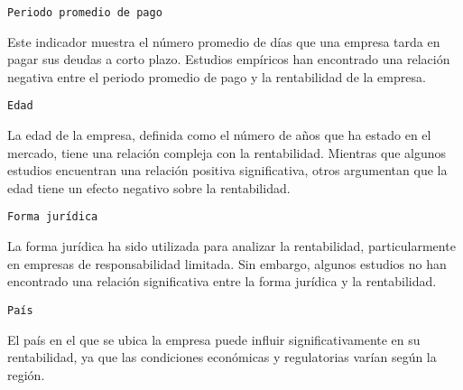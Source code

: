 \documentclass[
]{article}
\begin{document}
\begin{verbatim}
Periodo promedio de pago
\end{verbatim}

Este indicador muestra el número promedio de días que una empresa tarda
en pagar sus deudas a corto plazo. Estudios empíricos han encontrado una
relación negativa entre el periodo promedio de pago y la rentabilidad de
la empresa.

\begin{verbatim}
Edad
\end{verbatim}

La edad de la empresa, definida como el número de años que ha estado en
el mercado, tiene una relación compleja con la rentabilidad. Mientras
que algunos estudios encuentran una relación positiva significativa,
otros argumentan que la edad tiene un efecto negativo sobre la
rentabilidad.

\begin{verbatim}
Forma jurídica
\end{verbatim}

La forma jurídica ha sido utilizada para analizar la rentabilidad,
particularmente en empresas de responsabilidad limitada. Sin embargo,
algunos estudios no han encontrado una relación significativa entre la
forma jurídica y la rentabilidad.

\begin{verbatim}
País
\end{verbatim}

El país en el que se ubica la empresa puede influir significativamente
en su rentabilidad, ya que las condiciones económicas y regulatorias
varían según la región.
\end{document}

